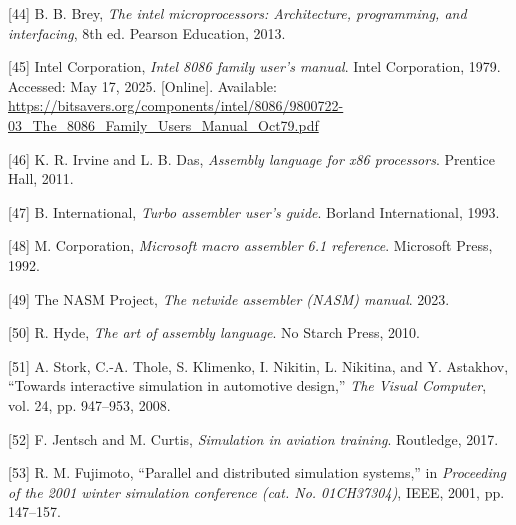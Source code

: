 \documentclass[12pt,oneside]{templates/unerthesis}
\newcommand{\CSLLeftMargin}[1]{#1} %
\newcommand{\CSLRightInline}[1]{#1} %
\newlength{\cslhangindent}
\newenvironment{CSLReferences}[2] %
 {\setlength{\parindent}{0pt}%
  \setlength{\leftskip}{#1 pt\relax}%
  \setlength{\parskip}{#2 pt\relax}%
  \everypar{\setlength{\hangindent}{\cslhangindent}}}
 {\par}
\begin{document}
\begin{CSLReferences}{0}{0}
\leavevmode{}%
\CSLLeftMargin{{[}44{]} }%
\CSLRightInline{B. B. Brey, \emph{The intel microprocessors: Architecture, programming, and interfacing}, 8th ed. Pearson Education, 2013.}

\leavevmode{}%
\CSLLeftMargin{{[}45{]} }%
\CSLRightInline{Intel Corporation, \emph{Intel 8086 family user's manual}. Intel Corporation, 1979. Accessed: May 17, 2025. {[}Online{]}. Available: \url{https://bitsavers.org/components/intel/8086/9800722-03_The_8086_Family_Users_Manual_Oct79.pdf}}

\leavevmode{}%
\CSLLeftMargin{{[}46{]} }%
\CSLRightInline{K. R. Irvine and L. B. Das, \emph{Assembly language for x86 processors}. Prentice Hall, 2011.}

\leavevmode{}%
\CSLLeftMargin{{[}47{]} }%
\CSLRightInline{B. International, \emph{Turbo assembler user's guide}. Borland International, 1993.}

\leavevmode{}%
\CSLLeftMargin{{[}48{]} }%
\CSLRightInline{M. Corporation, \emph{Microsoft macro assembler 6.1 reference}. Microsoft Press, 1992.}

\leavevmode{}%
\CSLLeftMargin{{[}49{]} }%
\CSLRightInline{The NASM Project, \emph{The netwide assembler (NASM) manual}. 2023.}

\leavevmode{}%
\CSLLeftMargin{{[}50{]} }%
\CSLRightInline{R. Hyde, \emph{The art of assembly language}. No Starch Press, 2010.}

\leavevmode{}%
\CSLLeftMargin{{[}51{]} }%
\CSLRightInline{A. Stork, C.-A. Thole, S. Klimenko, I. Nikitin, L. Nikitina, and Y. Astakhov, {``Towards interactive simulation in automotive design,''} \emph{The Visual Computer}, vol. 24, pp. 947--953, 2008.}

\leavevmode{}%
\CSLLeftMargin{{[}52{]} }%
\CSLRightInline{F. Jentsch and M. Curtis, \emph{Simulation in aviation training}. Routledge, 2017.}

\leavevmode{}%
\CSLLeftMargin{{[}53{]} }%
\CSLRightInline{R. M. Fujimoto, {``Parallel and distributed simulation systems,''} in \emph{Proceeding of the 2001 winter simulation conference (cat. No. 01CH37304)}, IEEE, 2001, pp. 147--157.}


\end{CSLReferences}
\end{document}
